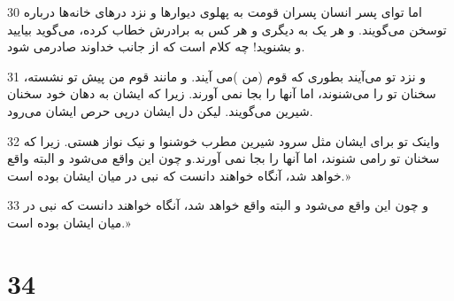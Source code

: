 \par 30 اما تو‌ای پسر انسان پسران قومت به پهلوی دیوارها و نزد درهای خانه‌ها درباره توسخن می‌گویند. و هر یک به دیگری و هر کس به برادرش خطاب کرده، می‌گوید بیایید و بشنوید! چه کلام است که از جانب خداوند صادرمی شود.
\par 31 و نزد تو می‌آیند بطوری که قوم (من )می آیند. و مانند قوم من پیش تو نشسته، سخنان تو را می‌شنوند، اما آنها را بجا نمی آورند. زیرا که ایشان به دهان خود سخنان شیرین می‌گویند. لیکن دل ایشان در‌پی حرص ایشان می‌رود.
\par 32 واینک تو برای ایشان مثل سرود شیرین مطرب خوشنوا و نیک نواز هستی. زیرا که سخنان تو رامی شنوند، اما آنها را بجا نمی آورند.و چون این واقع می‌شود و البته واقع خواهد شد، آنگاه خواهند دانست که نبی در میان ایشان بوده است.»
\par 33 و چون این واقع می‌شود و البته واقع خواهد شد، آنگاه خواهند دانست که نبی در میان ایشان بوده است.»

\chapter{34}

